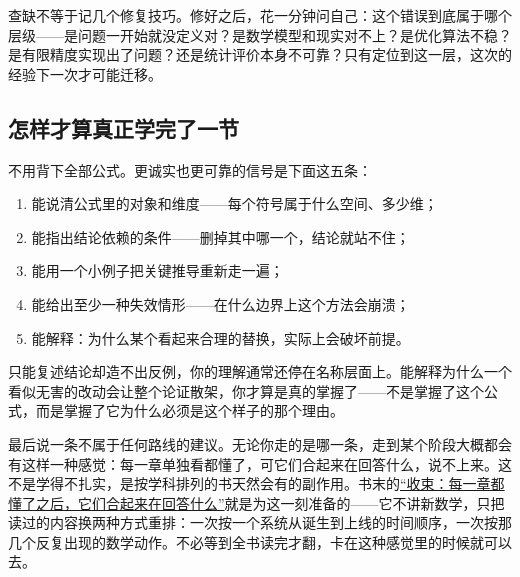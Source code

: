 查缺不等于记几个修复技巧。修好之后，花一分钟问自己：这个错误到底属于哪个层级——是问题一开始就没定义对？是数学模型和现实对不上？是优化算法不稳？是有限精度实现出了问题？还是统计评价本身不可靠？只有定位到这一层，这次的经验下一次才可能迁移。

\subsection{怎样才算真正学完了一节}

不用背下全部公式。更诚实也更可靠的信号是下面这五条：

\begin{enumerate}
\tightlist
\item 能说清公式里的对象和维度——每个符号属于什么空间、多少维；
\item 能指出结论依赖的条件——删掉其中哪一个，结论就站不住；
\item 能用一个小例子把关键推导重新走一遍；
\item 能给出至少一种失效情形——在什么边界上这个方法会崩溃；
\item 能解释：为什么某个看起来合理的替换，实际上会破坏前提。
\end{enumerate}

只能复述结论却造不出反例，你的理解通常还停在名称层面上。能解释为什么一个看似无害的改动会让整个论证散架，你才算是真的掌握了——不是掌握了这个公式，而是掌握了它为什么必须是这个样子的那个理由。

最后说一条不属于任何路线的建议。无论你走的是哪一条，走到某个阶段大概都会有这样一种感觉：每一章单独看都懂了，可它们合起来在回答什么，说不上来。这不是学得不扎实，是按学科排列的书天然会有的副作用。书末的\hyperref[ch:143]{``收束：每一章都懂了之后，它们合起来在回答什么''}就是为这一刻准备的——它不讲新数学，只把读过的内容换两种方式重排：一次按一个系统从诞生到上线的时间顺序，一次按那几个反复出现的数学动作。不必等到全书读完才翻，卡在这种感觉里的时候就可以去。
